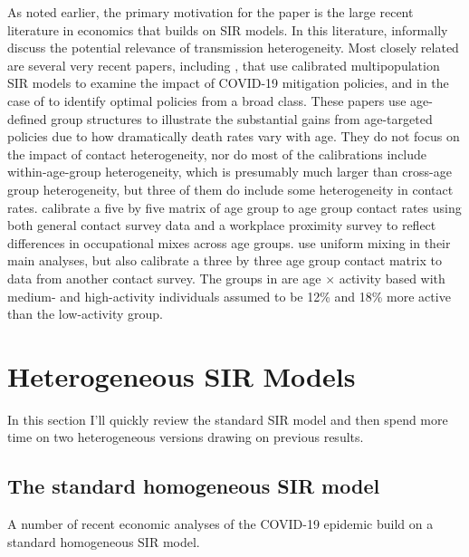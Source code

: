 \documentclass[11pt]{article}
\begin{document}
As noted earlier, the primary motivation for the paper is the large recent literature in economics that builds on SIR models. In this literature, \citet{avery2020policy} informally discuss the potential relevance of transmission heterogeneity.
Most closely related are several very recent papers, including \citet{acemoglu2020multi, baqaee2020reopening, favero2020restarting, rampini2020sequential}, that use calibrated multipopulation SIR models to examine the impact of COVID-19 mitigation policies, and in the case of \citet{acemoglu2020multi} to identify optimal policies from a broad class. These papers use age-defined group structures to illustrate the substantial gains from age-targeted policies due to how dramatically death rates vary with age. They do not focus on the impact of contact heterogeneity, nor do most of the calibrations include within-age-group heterogeneity, which is presumably much larger than cross-age group heterogeneity, but three of them do include some heterogeneity in contact rates. \citet{baqaee2020reopening} calibrate a five by
five matrix of age group to age group contact
rates using both general contact survey data and
a workplace proximity survey to reflect
differences in occupational mixes across age groups. \citet{acemoglu2020multi} use uniform mixing in their main analyses, but also calibrate a three
by three age group contact matrix to data from another contact survey. The groups in \citet{favero2020restarting} are age  $\times$ activity based with medium- and
high-activity individuals assumed to be 12\% and 18\% more active than the low-activity group. 

\section{Heterogeneous SIR Models}

In this section I'll quickly review the standard SIR model and then spend more time on two heterogeneous versions drawing on previous results.

\subsection{The standard homogeneous SIR model}

A number of recent economic analyses of the COVID-19 epidemic build on a standard homogeneous SIR model. 
\end{document}
